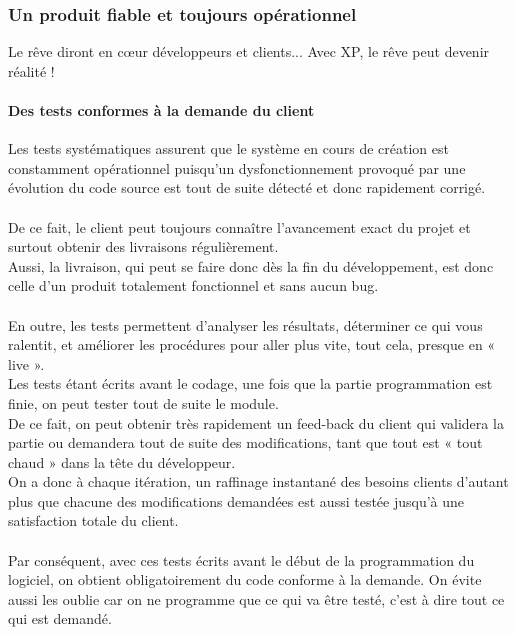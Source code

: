 \documentclass[]{article}
\let\oldparagraph\paragraph
\renewcommand{\paragraph}[1]{\oldparagraph{#1}\mbox{}}
\begin{document}
\hypertarget{un-produit-fiable-et-toujours-opuxe9rationnel}{%
\subsubsection{Un produit fiable et toujours
opérationnel}\label{un-produit-fiable-et-toujours-opuxe9rationnel}}

Le rêve diront en cœur développeurs et clients... Avec XP, le rêve peut
devenir réalité !




\hypertarget{des-tests-conformes-uxe0-la-demande-du-client}{%
\paragraph{Des tests conformes à la demande du
client}\label{des-tests-conformes-uxe0-la-demande-du-client}}

Les tests systématiques assurent que le système en cours de création est
constamment opérationnel puisqu'un dysfonctionnement provoqué par une
évolution du code source est tout de suite détecté et donc rapidement
corrigé.\\
~\\
De ce fait, le client peut toujours connaître l'avancement exact du
projet et surtout obtenir des livraisons régulièrement.~~\\
Aussi, la livraison, qui peut se faire donc dès la fin du développement,
est donc celle d'un produit totalement fonctionnel et sans aucun bug.\\
~\\
En outre, les tests permettent d'analyser les résultats, déterminer ce
qui vous ralentit, et améliorer les procédures pour aller plus vite,
tout cela, presque en « live ».~\\
Les tests étant écrits avant le codage, une fois que la partie
programmation est finie, on peut tester tout de suite le module.~\\
De ce fait, on peut obtenir très rapidement un feed-back du client qui
validera la partie ou demandera tout de suite des modifications, tant
que tout est « tout chaud » dans la tête du développeur.\\
On a donc à chaque itération, un raffinage instantané des besoins
clients d'autant plus que chacune des modifications demandées est aussi
testée jusqu'à une satisfaction totale du client.\\
~\\
Par conséquent, avec ces tests écrits avant le début de la programmation
du logiciel, on obtient obligatoirement du code conforme à la demande.
On évite aussi les oublie car on ne programme que ce qui va être testé,
c'est à dire tout ce qui est demandé.~
\end{document}
